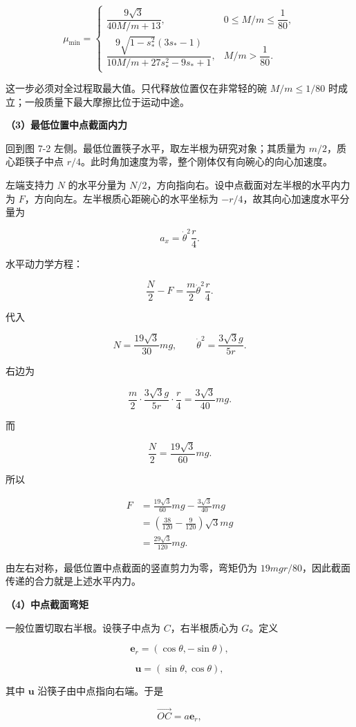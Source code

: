 \documentclass[12pt,a4paper,UTF8]{ctexart}
\begin{document}
\[\boxed{
\mu_{\min}=
\begin{cases}
\dfrac{9\sqrt3}{40M/m+13},&0\le M/m\le\dfrac1{80},\\[1.1em]
\dfrac{9\sqrt{1-s_*^2}(3s_*-1)}{10M/m+27s_*^2-9s_*+1},&M/m>\dfrac1{80}.
\end{cases}
}\]

这一步必须对全过程取最大值。只代释放位置仅在非常轻的碗 \(M/m\le1/80\)
时成立；一般质量下最大摩擦比位于运动中途。

\textbf{（3）最低位置中点截面内力}

回到图 7-2 左侧。最低位置筷子水平，取左半根为研究对象；其质量为
\(m/2\)，质心距筷子中点
\(r/4\)。此时角加速度为零，整个刚体仅有向碗心的向心加速度。

左端支持力 \(N\) 的水平分量为
\(N/2\)，方向指向右。设中点截面对左半根的水平内力为
\(F\)，方向向左。左半根质心距碗心的水平坐标为
\(-r/4\)，故其向心加速度水平分量为

\[a_x=\dot\theta^2\frac r4.\]

水平动力学方程：

\[\frac N2-F=\frac m2\dot\theta^2\frac r4.\]

代入

\[N=\frac{19\sqrt3}{30}mg,\qquad
\dot\theta^2=\frac{3\sqrt3g}{5r}.\]

右边为

\[\frac m2\cdot\frac{3\sqrt3g}{5r}\cdot\frac r4
=\frac{3\sqrt3}{40}mg.\]

而

\[\frac N2=\frac{19\sqrt3}{60}mg.\]

所以

\[\begin{aligned}
F
&=\frac{19\sqrt3}{60}mg-\frac{3\sqrt3}{40}mg\\
&=\left(\frac{38}{120}-\frac9{120}\right)\sqrt3mg\\
&=\boxed{\frac{29\sqrt3}{120}mg}.
\end{aligned}\]

由左右对称，最低位置中点截面的竖直剪力为零，弯矩仍为
\(19mgr/80\)，因此截面传递的合力就是上述水平内力。

\textbf{（4）中点截面弯矩}

一般位置切取右半根。设筷子中点为 \(C\)，右半根质心为 \(G\)。定义

\[\bm e_r=(\cos\theta,-\sin\theta),\]

\[\bm u=(\sin\theta,\cos\theta),\]

其中 \(\bm u\) 沿筷子由中点指向右端。于是

\[\overrightarrow{OC}=a\bm e_r,\]
\end{document}
